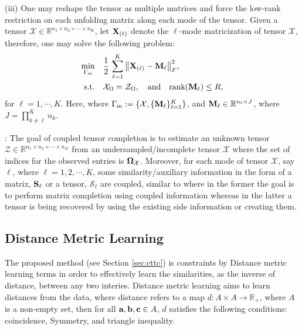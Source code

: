 \documentclass{article}
\newcommand{\R}{{\mathbb R}}
\newcommand{\T}{\mathcal}
\newcommand{\m}[1]{{\bf{#1}}}
\newcommand{\mb}[1]{{\mathbb{#1}}}
\begin{document}
(iii)
One may reshape the tensor as
multiple matrices and force the low-rank restriction on each unfolding matrix along each
mode of the tensor. Given a tensor $\T X\in \mathbb R^{n_1\times n_2\times \cdots \times n_K}$, let $\m X_{(\ell)}$ denote the $\ell$-mode matricization of tensor $\T X$, therefore, one may solve the following problem: 
\begin{equation}\label{eq:matrix}
\begin{aligned}
\min\limits_{ \Gamma_{\text m} } \quad  & \frac12\,\sum\limits_{\ell=1}^K \big{\|}\m X_{(\ell)}- \m M_\ell\big{\|}_F^2, \\
\textrm{s.t.} \quad &{\T X}_\Omega =  {\T{Z}}_\Omega, \quad \text{and} \quad \text{rank}(\m M_\ell) \le R, 
\end{aligned}
\end{equation}
for $\ell=1, \cdots, K$. Here, where $\Gamma_{\text m}:=\{\T X,  \{\m{M}_{\ell}\}_{\ell=1}^K\}$, and $\m M_\ell\in \R ^{n_\ell \times J}$, where $J=\prod_{k\neq \ell}^K n_k$.


:
The goal of coupled tensor completion is to estimate an unknown tensor ${\T{Z}} \in \mathbb R^{n_1\times n_2\times \cdots \times n_K}$ from an undersampled/incomplete tensor $\T X$ where the set of indices for the observed entries is $\m \Omega_{\T X}$. Moreover, for each mode of tensor $\T X$, say $\ell$, where $\ell=1, 2, \cdots, K$, some similarity/auxiliary information in the form of a matrix, $\m S_\ell$ or a tensor, $\T S_\ell$ are coupled, similar to \cite{bagherian2021coupled, bagherian2022bilevel} where in the former the goal is to perform matrix completion using coupled information whereas in the latter a tensor is being recovered by using the existing side information or creating them. 



\subsection{Distance Metric Learning}
The proposed method (see Section \ref{sec:cttc}) is constraints by Distance metric learning terms in order to effectively learn the similarities, as the inverse of distance, between any two interies. Distance metric learning \cite{suarez2018tutorial} aims to learn distances from the data, where distance refers to a map $d:A\times A\to \mb R_+$, where $A$ is a non-empty set, then for all $\m a, \m b, \m c\in A$, $d$ satisfies the following conditions: coincidence,  Symmetry, and triangle inequality.
\end{document}
